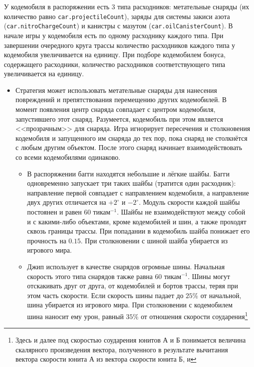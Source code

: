 У кодемобиля в распоряжении есть $3$ типа расходников: метательные снаряды (их количество равно \texttt{car.projectileCount}), заряды для
системы закиси азота (\texttt{car.nitroChargeCount}) и канистры с мазутом (\texttt{car.oilCanisterCount}). В начале игры у кодемобиля есть
по одному расходнику каждого типа. При завершении очередного круга трассы количество расходников каждого типа у кодемобиля увеличивается на
единицу. При подборе кодемобилем бонуса, содержащего расходники, количество расходников соответствующего типа увеличивается на единицу.

\begin{itemize}
  \item Стратегия может использовать метательные снаряды для нанесения повреждений и препятствования перемещению других кодемобилей. В
        момент появления центр снаряда совпадает с центром кодемобиля, запустившего этот снаряд. Разумеется, кодемобиль при этом является
        <<прозрачным>> для снаряда. Игра игнорирует пересечения и столкновения кодемобиля и запущенного им снаряда до тех пор, пока снаряд
        не столкнётся с любым другим объектом. После этого снаряд начинает взаимодействовать со всеми кодемобилями одинаково.
        \begin{itemize}
          \item В распоряжении багги находятся небольшие и лёгкие шайбы. Багги одновременно запускает три таких шайбы (тратится один
                расходник): направление первой совпадает с направлением кодемобиля, а направление двух других отличается на $+2^\circ$ и
                $-2^\circ$. Модуль скорости каждой шайбы постоянен и равен $60$ тикам$^{-1}$. Шайбы не взаимодействуют между собой и с
                какими-либо объектами, кроме кодемобилей и шин, а также проходят сквозь границы трассы. При попадании в кодемобиль шайба
                понижает его прочность на $0.15$. При столкновении с шиной шайба убирается из игрового мира.
          \item Джип использует в качестве снарядов огромные шины. Начальная скорость этого типа снарядов также равна $60$ тикам$^{-1}$.
                Шины могут отскакивать друг от друга, от кодемобилей и бортов трассы, теряя при этом часть скорости. Если скорость шины
                падает до $25\%$ от начальной, шина убирается из игрового мира. При столкновении с кодемобилем шина наносит ему урон, равный
                $35\%$ от отношения скорости соударения\footnote[2]{Здесь и далее под скоростью соударения юнитов А и Б понимается величина
                скалярного произведения вектора, полученного в результате вычитания вектора скорости юнита А из вектора скорости юнита Б, и
}
\end{itemize}
\end{itemize}
